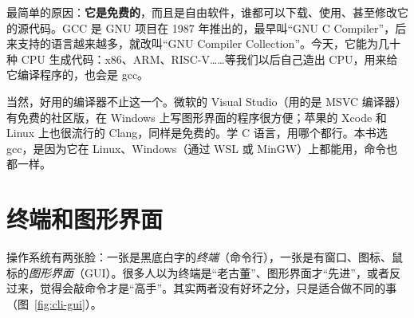 最简单的原因：\textbf{它是免费的}，而且是自由软件，谁都可以下载、使用、甚至修改它的源代码。GCC 是 GNU 项目在 1987 年推出的，最早叫“GNU C Compiler”，后来支持的语言越来越多，就改叫“GNU Compiler Collection”。今天，它能为几十种 CPU 生成代码：x86、ARM、RISC-V……等我们以后自己造出 CPU，用来给它编译程序的，也会是 gcc。

当然，好用的编译器不止这一个。微软的 Visual Studio（用的是 MSVC 编译器）有免费的社区版，在 Windows 上写图形界面的程序很方便；苹果的 Xcode 和 Linux 上也很流行的 Clang，同样是免费的。学 C 语言，用哪个都行。本书选 gcc，是因为它在 Linux、Windows（通过 WSL 或 MinGW）上都能用，命令也都一样。

\section{终端和图形界面}

操作系统有两张脸：一张是黑底白字的\emph{终端}（命令行），一张是有窗口、图标、鼠标的\emph{图形界面}（GUI）。很多人以为终端是“老古董”、图形界面才“先进”，或者反过来，觉得会敲命令才是“高手”。其实两者没有好坏之分，只是适合做不同的事（图~\ref{fig:cli-gui}）。

